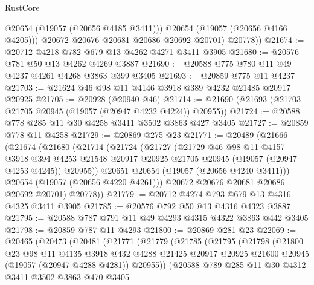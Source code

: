 \begin{lexlean}{RustCore}
\begin{coremodule}
              @20654
              (@19057 (@20656 @4185 @3411)))
            @20654
            (@19057 (@20656 @4166 @4205)))
          @20672
          @20676
          @20681
          @20686
          @20692
          @20701)
        @20778))
@21674 := @20712 @4218 @782 @679 @13 @4262 @4271 @3411 @3905
@21680 := @20576 @781 @50 @13 @4262 @4269 @3887
@21690 := @20588 @775 @780 @11 @49 @4237 @4261 @4268 @3863 @399 @3405
@21693 := @20859 @775 @11 @4237
@21703 := @21624 @46 @98 @11 @4146 @3918 @389 @4232 @21485 @20917 @20925
@21705 := @20928 (@20940 @46)
@21714 := @21690 (@21693 (@21703 @21705 @20945 (@19057 (@20947 @4232 @4224)) @20955))
@21724 := @20588 @778 @285 @11 @30 @4258 @3411 @3502 @3863 @427 @3405
@21727 := @20859 @778 @11 @4258
@21729 := @20869 @275 @23
@21771 := @20489
    (@21666
      (@21674
        (@21680
          (@21714
            (@21724
              (@21727
                (@21729
                  @46
                  @98
                  @11
                  @4157
                  @3918
                  @394
                  @4253
                  @21548
                  @20917
                  @20925
                  @21705
                  @20945
                  (@19057 (@20947 @4253 @4245))
                  @20955))
              @20651
              @20654
              (@19057 (@20656 @4240 @3411)))
            @20654
            (@19057 (@20656 @4220 @4261)))
          @20672
          @20676
          @20681
          @20686
          @20692
          @20701)
        @20778))
@21779 := @20712 @4274 @793 @679 @13 @4316 @4325 @3411 @3905
@21785 := @20576 @792 @50 @13 @4316 @4323 @3887
@21795 := @20588 @787 @791 @11 @49 @4293 @4315 @4322 @3863 @442 @3405
@21798 := @20859 @787 @11 @4293
@21800 := @20869 @281 @23
@22069 := @20465
    (@20473
      (@20481
        (@21771
          (@21779
            (@21785
              (@21795
                (@21798
                  (@21800
                    @23
                    @98
                    @11
                    @4135
                    @3918
                    @432
                    @4288
                    @21425
                    @20917
                    @20925
                    @21600
                    @20945
                    (@19057 (@20947 @4288 @4281))
                    @20955))
                (@20588
                  @789
                  @285
                  @11
                  @30
                  @4312
                  @3411
                  @3502
                  @3863
                  @470
                  @3405

\end{coremodule}
\end{lexlean}
